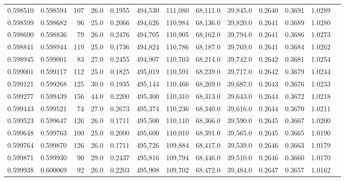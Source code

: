 \begin{tabular}{rrrrrrrrrrrrr}
0.598510 & 0.598594 &   107 & 26.0 &                                     0.1955 & 494,530 & 111,080 &  68,111.0 &  39,845.0 & 0.2640 & 0.3691 & 1.0289 \\
0.598599 & 0.598682 &    96 & 25.0 &                                     0.2066 & 494,626 & 110,984 &  68,136.0 &  39,820.0 & 0.2641 & 0.3689 & 1.0280 \\
0.598690 & 0.598836 &    79 & 26.0 &                                     0.2476 & 494,705 & 110,905 &  68,162.0 &  39,794.0 & 0.2641 & 0.3686 & 1.0273 \\
0.598841 & 0.598944 &   119 & 25.0 &                                     0.1736 & 494,824 & 110,786 &  68,187.0 &  39,769.0 & 0.2641 & 0.3684 & 1.0262 \\
0.598945 & 0.599001 &    83 & 27.0 &                                     0.2455 & 494,907 & 110,703 &  68,214.0 &  39,742.0 & 0.2642 & 0.3681 & 1.0254 \\
0.599001 & 0.599117 &   112 & 25.0 &                                     0.1825 & 495,019 & 110,591 &  68,239.0 &  39,717.0 & 0.2642 & 0.3679 & 1.0244 \\
0.599121 & 0.599268 &   125 & 30.0 &                                     0.1935 & 495,144 & 110,466 &  68,269.0 &  39,687.0 & 0.2643 & 0.3676 & 1.0233 \\
0.599277 & 0.599439 &   156 & 44.0 &                                     0.2200 & 495,300 & 110,310 &  68,313.0 &  39,643.0 & 0.2644 & 0.3672 & 1.0218 \\
0.599443 & 0.599521 &    74 & 27.0 &                                     0.2673 & 495,374 & 110,236 &  68,340.0 &  39,616.0 & 0.2644 & 0.3670 & 1.0211 \\
0.599523 & 0.599647 &   126 & 26.0 &                                     0.1711 & 495,500 & 110,110 &  68,366.0 &  39,590.0 & 0.2645 & 0.3667 & 1.0200 \\
0.599648 & 0.599763 &   100 & 25.0 &                                     0.2000 & 495,600 & 110,010 &  68,391.0 &  39,565.0 & 0.2645 & 0.3665 & 1.0190 \\
0.599764 & 0.599870 &   126 & 26.0 &                                     0.1711 & 495,726 & 109,884 &  68,417.0 &  39,539.0 & 0.2646 & 0.3663 & 1.0179 \\
0.599871 & 0.599930 &    90 & 29.0 &                                     0.2437 & 495,816 & 109,794 &  68,446.0 &  39,510.0 & 0.2646 & 0.3660 & 1.0170 \\
0.599938 & 0.600069 &    92 & 26.0 &                                     0.2203 & 495,908 & 109,702 &  68,472.0 &  39,484.0 & 0.2647 & 0.3657 & 1.0162 \\

\end{tabular}
